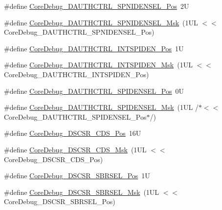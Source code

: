 \begin{DoxyCompactItemize}
\item 
\#define \mbox{\hyperlink{group___c_m_s_i_s___core_debug_ga866734a8e4bec2d6cf091e265c6c0f3d}{Core\+Debug\+\_\+\+D\+A\+U\+T\+H\+C\+T\+R\+L\+\_\+\+S\+P\+N\+I\+D\+E\+N\+S\+E\+L\+\_\+\+Pos}}~2U
\item 
\#define \mbox{\hyperlink{group___c_m_s_i_s___core_debug_gaabb5d6c750c9ec50254134ece2111dcd}{Core\+Debug\+\_\+\+D\+A\+U\+T\+H\+C\+T\+R\+L\+\_\+\+S\+P\+N\+I\+D\+E\+N\+S\+E\+L\+\_\+\+Msk}}~(1\+U\+L $<$$<$ Core\+Debug\+\_\+\+D\+A\+U\+T\+H\+C\+T\+R\+L\+\_\+\+S\+P\+N\+I\+D\+E\+N\+S\+E\+L\+\_\+\+Pos)
\item 
\#define \mbox{\hyperlink{group___c_m_s_i_s___core_debug_ga3caef9790e4e2ccbfea77d55315ad59f}{Core\+Debug\+\_\+\+D\+A\+U\+T\+H\+C\+T\+R\+L\+\_\+\+I\+N\+T\+S\+P\+I\+D\+E\+N\+\_\+\+Pos}}~1U
\item 
\#define \mbox{\hyperlink{group___c_m_s_i_s___core_debug_ga1570f149a0f89f70fc2644a5842cbcb4}{Core\+Debug\+\_\+\+D\+A\+U\+T\+H\+C\+T\+R\+L\+\_\+\+I\+N\+T\+S\+P\+I\+D\+E\+N\+\_\+\+Msk}}~(1\+U\+L $<$$<$ Core\+Debug\+\_\+\+D\+A\+U\+T\+H\+C\+T\+R\+L\+\_\+\+I\+N\+T\+S\+P\+I\+D\+E\+N\+\_\+\+Pos)
\item 
\#define \mbox{\hyperlink{group___c_m_s_i_s___core_debug_ga587610b7ac18292de47bf9d675b0b88c}{Core\+Debug\+\_\+\+D\+A\+U\+T\+H\+C\+T\+R\+L\+\_\+\+S\+P\+I\+D\+E\+N\+S\+E\+L\+\_\+\+Pos}}~0U
\item 
\#define \mbox{\hyperlink{group___c_m_s_i_s___core_debug_gaa043fd13768d57be320c682ca1c9b234}{Core\+Debug\+\_\+\+D\+A\+U\+T\+H\+C\+T\+R\+L\+\_\+\+S\+P\+I\+D\+E\+N\+S\+E\+L\+\_\+\+Msk}}~(1\+U\+L /$\ast$$<$$<$ Core\+Debug\+\_\+\+D\+A\+U\+T\+H\+C\+T\+R\+L\+\_\+\+S\+P\+I\+D\+E\+N\+S\+E\+L\+\_\+\+Pos$\ast$/)
\item 
\#define \mbox{\hyperlink{group___c_m_s_i_s___core_debug_ga4be5d0f8af5d7d8ec04bde78ce18e10e}{Core\+Debug\+\_\+\+D\+S\+C\+S\+R\+\_\+\+C\+D\+S\+\_\+\+Pos}}~16U
\item 
\#define \mbox{\hyperlink{group___c_m_s_i_s___core_debug_ga083417245e1aa40e84a2b12433a15a6b}{Core\+Debug\+\_\+\+D\+S\+C\+S\+R\+\_\+\+C\+D\+S\+\_\+\+Msk}}~(1\+U\+L $<$$<$ Core\+Debug\+\_\+\+D\+S\+C\+S\+R\+\_\+\+C\+D\+S\+\_\+\+Pos)
\item 
\#define \mbox{\hyperlink{group___c_m_s_i_s___core_debug_ga7450603163415ab4d4e4a7a767879eae}{Core\+Debug\+\_\+\+D\+S\+C\+S\+R\+\_\+\+S\+B\+R\+S\+E\+L\+\_\+\+Pos}}~1U
\item 
\#define \mbox{\hyperlink{group___c_m_s_i_s___core_debug_gaaffe28a24f05446e55ba3d75bb6f4cd0}{Core\+Debug\+\_\+\+D\+S\+C\+S\+R\+\_\+\+S\+B\+R\+S\+E\+L\+\_\+\+Msk}}~(1\+U\+L $<$$<$ Core\+Debug\+\_\+\+D\+S\+C\+S\+R\+\_\+\+S\+B\+R\+S\+E\+L\+\_\+\+Pos)

\end{DoxyCompactItemize}
